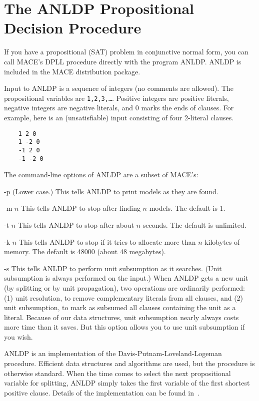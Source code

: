 \documentclass[11pt]{article}
\begin{document}
\section{The ANLDP Propositional Decision Procedure} \label{anldp}

If you have a propositional (SAT) problem in conjunctive normal
form, you can call MACE's DPLL procedure directly with the
program ANLDP.
ANLDP is included in the MACE distribution package.

Input to ANLDP is a sequence of integers (no comments are allowed).
The propositional variables are \texttt{1,2,3,\ldots}.
Positive integers are positive literals,
negative integers are negative literals,
and 0 marks the ends of clauses.
For example, here is an (unsatisfiable) input consisting of
four 2-literal clauses.

\begin{small}
\begin{verbatim}
    1 2 0
    1 -2 0
    -1 2 0
    -1 -2 0
\end{verbatim}
\end{small}
\noindent The command-line options of ANLDP are a subset of MACE's:
\begin{clo}
\item[-p]
(Lower case.) This tells ANLDP to print models as they are found.
\item[-m $n$]
This tells ANLDP to stop after finding $n$ models.  The default is 1.
\item[-t $n$]
This tells ANLDP to stop after about $n$ seconds.  The default is unlimited.
\item[-k $n$]
This tells ANLDP to stop if it tries to allocate more than $n$ kilobytes
of memory. The default is 48000 (about 48 megabytes).
\item[-s]
This tells ANLDP to perform unit subsumption as it searches.
(Unit subsumption is always performed on the input.)
When ANLDP gets a new unit (by splitting or by unit propagation),
two operations are ordinarily performed: (1) unit resolution, to
remove complementary literals from all clauses, and (2) unit
subsumption, to mark as subsumed all clauses containing the
unit as a literal.  Because of our data structures, unit subsumption
nearly always costs more time than it saves.  But this option
allows you to use unit subsumption if you wish.
\end{clo}

ANLDP is an implementation of the Davis-Putnam-Loveland-Logeman
procedure.  Efficient data structures and algorithms are used,
but the procedure is otherwise standard.
When the time comes to select the next propositional variable
for splitting, ANLDP simply takes the first variable of the first shortest
positive clause.
Details of the implementation can be found in~\cite{dp-quasi}.




\end{document}

